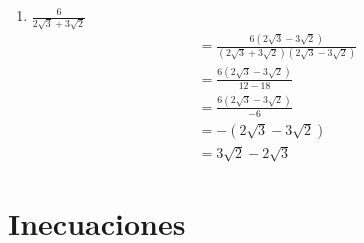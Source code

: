 \documentclass[12pt,a4paper]{article}
\begin{document}
\begin{enumerate}
    \item $\frac{6}{2\sqrt{3} + 3\sqrt{2}}$
    \begin{align*}
        &= \frac{6(2\sqrt{3} - 3\sqrt{2})}{(2\sqrt{3} + 3\sqrt{2})(2\sqrt{3} - 3\sqrt{2})}\\
        &= \frac{6(2\sqrt{3} - 3\sqrt{2})}{12 - 18}\\
        &= \frac{6(2\sqrt{3} - 3\sqrt{2})}{-6}\\
        &= -(2\sqrt{3} - 3\sqrt{2})\\
        &= 3\sqrt{2} - 2\sqrt{3}
    \end{align*}
\end{enumerate}

\section{Inecuaciones}
\end{document}
